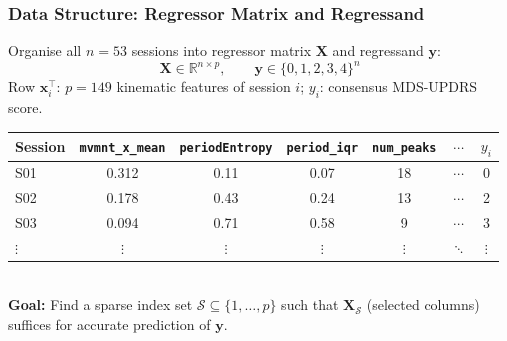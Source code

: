 \documentclass[aspectratio=169]{beamer}
\begin{document}
\begin{frame}
    \frametitle{Data Structure: Regressor Matrix and Regressand}
    \small
    Organise all $n{=}53$ sessions into regressor matrix $\mathbf{X}$ and regressand $\mathbf{y}$:
    \[
        \mathbf{X} \in \mathbb{R}^{n \times p},\qquad
        \mathbf{y} \in \{0,1,2,3,4\}^{n}
    \]
    Row $\mathbf{x}_i^{\top}$: $p{=}149$ kinematic features of session $i$;\quad
    $y_i$: consensus MDS-UPDRS score.\\[0.5em]
    \scriptsize
    \renewcommand{\arraystretch}{1.15}
    \begin{tabular}{lccccc|c}
        \toprule
        \textbf{Session} & \texttt{mvmnt\_x\_mean} & \texttt{periodEntropy} & \texttt{period\_iqr} & \texttt{num\_peaks} & $\cdots$ & $y_i$ \\
        \midrule
        S01 & 0.312 & 0.11 & 0.07 & 18 & $\cdots$ & 0 \\
        S02 & 0.178 & 0.43 & 0.24 & 13 & $\cdots$ & 2 \\
        S03 & 0.094 & 0.71 & 0.58 &  9 & $\cdots$ & 3 \\
        $\vdots$ & $\vdots$ & $\vdots$ & $\vdots$ & $\vdots$ & $\ddots$ & $\vdots$ \\
        \bottomrule
    \end{tabular}\\[0.5em]
    \small
    \textbf{Goal:} Find a sparse index set $\mathcal{S} \subseteq \{1,\ldots,p\}$ such that
    $\mathbf{X}_{\mathcal{S}}$ (selected columns) suffices for accurate prediction of $\mathbf{y}$.
\end{frame}
\end{document}
